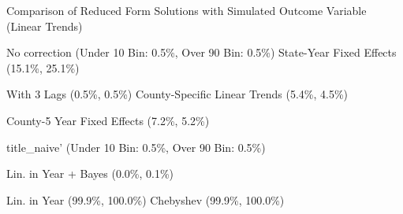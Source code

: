 \caption{Comparison of Reduced Form Solutions with Simulated Outcome Variable (Linear Trends) \label{fig:distributions-existing-solutions}}
\caption*{\color{p1line}{\textbf{\textemdash\textemdash}} No correction (Under 10 Bin: 0.5\%, Over 90 Bin: 0.5\%) \hspace{1cm} \color{p2line}{- - -} State-Year Fixed Effects (15.1\%, 25.1\%)}
\caption*{\color{p3line}{\textbf{- - -}} With 3 Lags (0.5\%, 0.5\%) \hspace{1cm} \color{p4line}{\textbf{- - -}} County-Specific Linear Trends (5.4\%, 4.5\%)}
\caption*{\color{p5line}{\textbf{- - -}} County-5 Year Fixed Effects (7.2\%, 5.2\%)}


\caption*{\color{p1line}{\textbf{\textemdash\textemdash}} title_naive' (Under 10 Bin: 0.5\%, Over 90 Bin: 0.5\%)}
\caption*{\color{p2line}{\textbf{- - -}} Lin. in Year + Bayes (0.0\%, 0.1\%)}
\caption*{\color{p3line}{\textbf{- - -}} Lin. in Year (99.9\%, 100.0\%) \hspace{1cm} \color{p4line}{\textbf{- - -}} Chebyshev (99.9\%, 100.0\%)}
